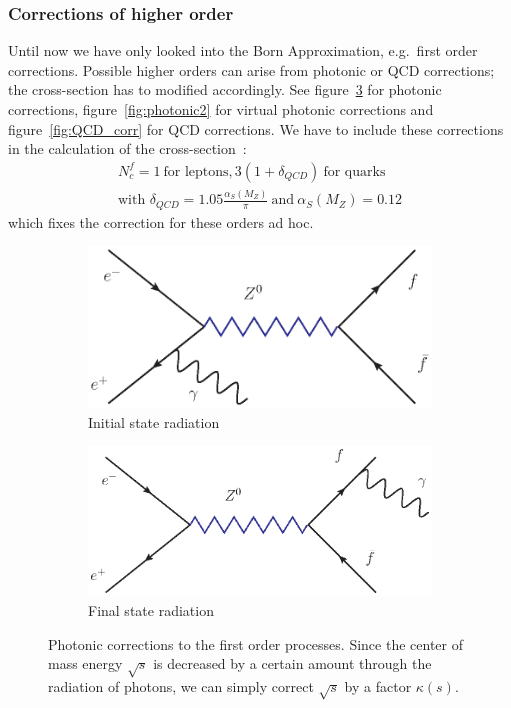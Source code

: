 \subsubsection{Corrections of higher order}
\label{ssub:Corrections_of_higher_order}
Until now we have only looked into the Born Approximation, e.g.\ first order corrections. Possible higher orders can arise
from photonic or QCD corrections; the cross-section has to modified accordingly. See figure~\ref{fig:photonic} for
photonic corrections, figure~\ref{fig:photonic2} for virtual photonic corrections and figure~\ref{fig:QCD_corr} for QCD
corrections. We have to include these corrections in the calculation of the cross-section~\cite{ver}:
    \begin{align*}
        \label{eq:qcd_corr}
        N_c^f = 1 \: \text{for leptons}, 3(1 + \delta_{QCD}) \: \text{for quarks}\\
        \text{with } \delta_{QCD} = 1.05 \frac{\alpha_S(M_Z)}{\pi} \: \text{and} \: \alpha_S(M_Z) = 0.12 
    \end{align*}
which fixes the correction for these orders ad hoc.
\begin{figure}[htpb]
\centering
\begin{subfigure}{.5\textwidth}
  \centering
  \includegraphics[width=1.0\linewidth]{figures/corr1}
  \caption{Initial state radiation}
  \label{fig:sub1}
\end{subfigure}%
\begin{subfigure}{.5\textwidth}
  \centering
  \includegraphics[width=1.0\linewidth]{figures/corr2}
  \caption{Final state radiation}
  \label{fig:sub2}
\end{subfigure}
\caption{Photonic corrections to the first order processes. Since the center of mass energy $\sqrt{s}$ is decreased 
by a certain amount through the radiation of photons, we can simply correct $\sqrt{s}$ by a factor $\kappa(s)$. }
\label{fig:photonic}
\end{figure}

